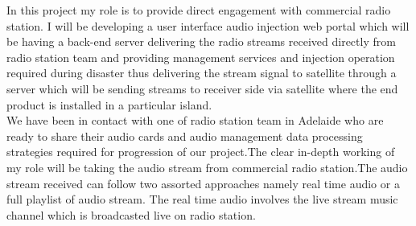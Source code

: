 In this project my role is to provide direct engagement with commercial radio station. I will be developing a user interface audio injection web portal which will be having a back-end server delivering the radio streams received directly from radio station team and providing management services and injection operation required during disaster thus delivering the stream signal to satellite through a server which will be sending streams to receiver side via satellite where the end product is installed in a particular island.\\

We have been in contact with one of radio station team in Adelaide who are ready to share their audio cards and audio management data processing strategies required for progression of our project.The clear in-depth working of my role will be taking the audio stream from commercial radio station.The audio stream received can follow two assorted approaches namely real time audio or a full playlist of audio stream. The real time audio involves the live stream music channel which is broadcasted live on radio station.\\


